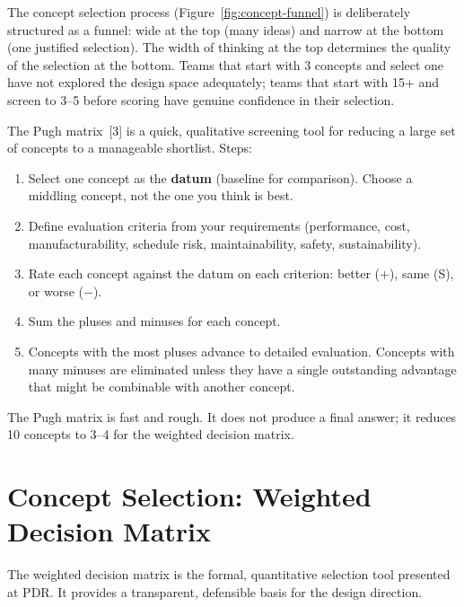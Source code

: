 The concept selection process (Figure~\ref{fig:concept-funnel}) is deliberately structured as a funnel: wide at the top (many ideas) and narrow at the bottom (one justified selection). The width of thinking at the top determines the quality of the selection at the bottom. Teams that start with 3 concepts and select one have not explored the design space adequately; teams that start with 15+ and screen to 3--5 before scoring have genuine confidence in their selection.

The Pugh matrix~[3] is a quick, qualitative screening tool for reducing a large set of concepts to a manageable shortlist. Steps:
\begin{enumerate}[nosep,leftmargin=1.5em]
\item Select one concept as the \textbf{datum} (baseline for comparison). Choose a middling concept, not the one you think is best.
\item Define evaluation criteria from your requirements (performance, cost, manufacturability, schedule risk, maintainability, safety, sustainability).
\item Rate each concept against the datum on each criterion: better (+), same (S), or worse ($-$).
\item Sum the pluses and minuses for each concept.
\item Concepts with the most pluses advance to detailed evaluation. Concepts with many minuses are eliminated unless they have a single outstanding advantage that might be combinable with another concept.
\end{enumerate}

The Pugh matrix is fast and rough. It does not produce a final answer; it reduces 10 concepts to 3--4 for the weighted decision matrix.

\section{Concept Selection: Weighted Decision Matrix}
The weighted decision matrix is the formal, quantitative selection tool presented at PDR. It provides a transparent, defensible basis for the design direction.

